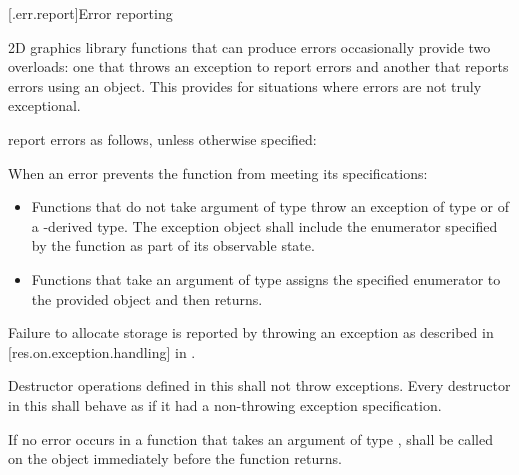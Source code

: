 [\iotwod.err.report]{Error reporting}

\pnum
2D graphics library functions that can produce errors occasionally provide two overloads: one that throws an exception to report errors and another that reports errors using an  object. This provides for situations where errors are not truly exceptional.

\pnum
report errors as follows, unless otherwise specified:

\pnum
When an error prevents the function from meeting its specifications:

\begin{itemize}
\item Functions that do not take argument of type  throw an exception of type  or of a -derived type. The exception object shall include the enumerator specified by the function as part of its observable state.

\item Functions that take an argument of type  assigns the specified enumerator to the provided  object and then returns.
\end{itemize}

\pnum
Failure to allocate storage is reported by throwing an exception as described in [res.on.exception.handling] in \CppXVII.

\pnum
Destructor operations defined in this \documenttypename{} shall not throw exceptions. Every destructor in this \documenttypename{} shall behave as if it had a non-throwing exception specification.

\pnum
If no error occurs in a function that takes an argument of type ,  shall be called on the  object immediately before the function returns.
